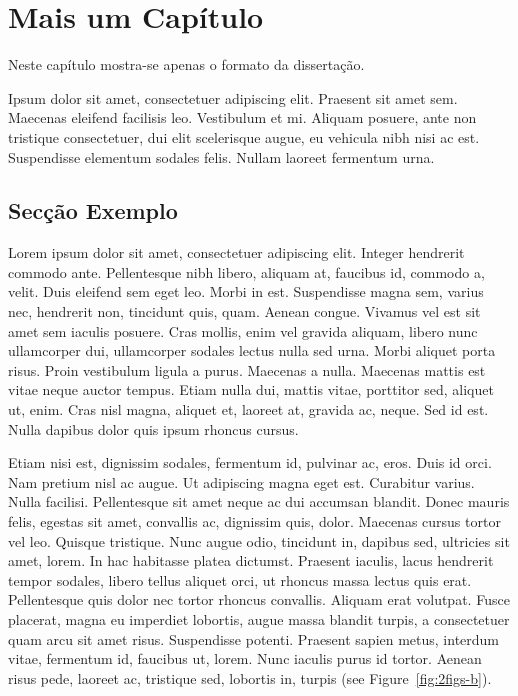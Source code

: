 \chapter{Mais um Capítulo}\label{chap:chap4}

Neste capítulo mostra-se apenas o formato da dissertação.

Ipsum dolor sit amet, consectetuer
adipiscing elit.  Praesent sit amet sem. 
Maecenas eleifend facilisis leo. Vestibulum et
mi. Aliquam posuere, ante non tristique consectetuer, dui elit
scelerisque augue, eu vehicula nibh nisi ac est. 
Suspendisse elementum sodales felis. 
Nullam laoreet fermentum urna. 

\section{Secção Exemplo}

Lorem ipsum dolor sit amet, consectetuer adipiscing elit. Integer
hendrerit commodo ante. Pellentesque nibh libero, aliquam at, faucibus
id, commodo a, velit. Duis eleifend sem eget leo. Morbi in
est. Suspendisse magna sem, varius nec, hendrerit non, tincidunt quis,
quam. Aenean congue. Vivamus vel est sit amet sem iaculis
posuere. Cras mollis, enim vel gravida aliquam, libero nunc
ullamcorper dui, ullamcorper sodales lectus nulla sed urna. Morbi
aliquet porta risus. Proin vestibulum ligula a purus. Maecenas a
nulla. Maecenas mattis est vitae neque auctor tempus. Etiam nulla dui,
mattis vitae, porttitor sed, aliquet ut, enim. Cras nisl magna,
aliquet et, laoreet at, gravida ac, neque. Sed id est. Nulla dapibus
dolor quis ipsum rhoncus cursus. 

Etiam nisi est, dignissim sodales, fermentum id, pulvinar ac,
eros. Duis id orci. Nam pretium nisl ac augue. Ut adipiscing magna
eget est. Curabitur varius. Nulla facilisi. Pellentesque sit amet
neque ac dui accumsan blandit. Donec mauris felis, egestas sit amet,
convallis ac, dignissim quis, dolor. Maecenas cursus tortor vel
leo. Quisque tristique. Nunc augue odio, tincidunt in, dapibus sed,
ultricies sit amet, lorem. In hac habitasse platea dictumst. Praesent
iaculis, lacus hendrerit tempor sodales, libero tellus aliquet orci,
ut rhoncus massa lectus quis erat. Pellentesque quis dolor nec tortor
rhoncus convallis. Aliquam erat volutpat. Fusce placerat, magna eu
imperdiet lobortis, augue massa blandit turpis, a consectetuer quam
arcu sit amet risus. Suspendisse potenti. Praesent sapien metus,
interdum vitae, fermentum id, faucibus ut, lorem. Nunc iaculis purus
id tortor. Aenean risus pede, laoreet ac, tristique sed, lobortis in,
turpis (see Figure~\ref{fig:2figs-b}). 

